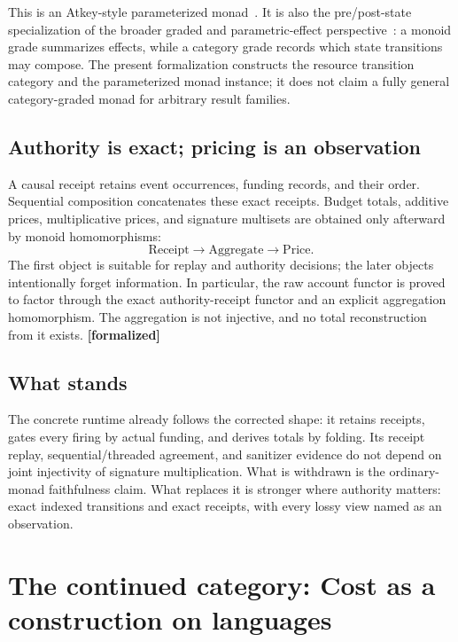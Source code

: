 \documentclass[11pt]{article}
\newcommand{\formalized}{\textbf{[formalized]}}
\begin{document}
This is an Atkey-style parameterized monad~\cite{atkey}.  It is also the
pre/post-state specialization of the broader graded and parametric-effect
perspective~\cite{katsumata,orchard-wadler-eades}: a
monoid grade summarizes effects, while a category grade records which state
transitions may compose.  The present formalization constructs the resource
transition category and the parameterized monad instance; it does not claim a
fully general category-graded monad for arbitrary result families.

\subsection{Authority is exact; pricing is an observation}

A causal receipt retains event occurrences, funding records, and their order.
Sequential composition concatenates these exact receipts.  Budget totals,
additive prices, multiplicative prices, and signature multisets are obtained
only afterward by monoid homomorphisms:
\[
 \mathrm{Receipt}
   \longrightarrow \mathrm{Aggregate}
   \longrightarrow \mathrm{Price}.
\]
The first object is suitable for replay and authority decisions; the later
objects intentionally forget information.  In particular, the raw account
functor is proved to factor through the exact authority-receipt functor and an
explicit aggregation homomorphism.  The aggregation is not injective, and no
total reconstruction from it exists. \formalized{}

\subsection{What stands}

The concrete runtime already follows the corrected shape: it retains receipts,
gates every firing by actual funding, and derives totals by folding.  Its
receipt replay, sequential/threaded agreement, and sanitizer evidence do not
depend on joint injectivity of signature multiplication.  What is withdrawn is
the ordinary-monad faithfulness claim.  What replaces it is stronger where
authority matters: exact indexed transitions and exact receipts, with every
lossy view named as an observation.

\section{The continued category: Cost as a construction on languages}
\label{sec:continued}
\end{document}
